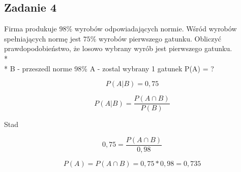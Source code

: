 \subsection{Zadanie 4}

Firma produkuje $98$\% wyrobów odpowiadających normie. Wśród wyrobów spełniających normę jest $75$\% wyrobów pierwszego gatunku. Obliczyć prawdopodobieństwo, że losowo wybrany wyrób jest pierwszego gatunku. \\* \\*		
B - przeszedl norme  98\%  \newline
A - zostal wybrany 1 gatunek \newline
P(A) = ?

$$ P(A|B) = 0,75 $$

$$ P(A|B) = \dfrac{P(A \cap B)}{ P(B)} $$

Stad

$$ 0,75 = \dfrac{P(A \cap B)}{0,98} $$

$$ P(A) = P(A \cap B) = 0,75 * 0, 98 = 0,735 $$

